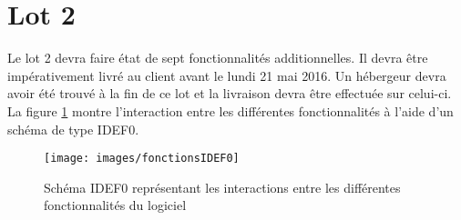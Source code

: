\section{Lot 2}
	Le lot 2 devra faire état de sept fonctionnalités additionnelles. Il devra être impérativement livré au client avant le lundi 21 mai 2016. Un hébergeur devra avoir été trouvé à la fin de ce lot et la livraison devra être effectuée sur celui-ci.\\
	
	La figure \ref{IDEF0} montre l’interaction entre les différentes fonctionnalités à l'aide d'un schéma de type IDEF0.

\begin{figure}[!h]
	\begin{center}
	\texttt{[image: images/fonctionsIDEF0]}
	\caption{\label{IDEF0} Schéma IDEF0 représentant les interactions entre les différentes fonctionnalités du logiciel}
	\end{center}
\end{figure}
















 



